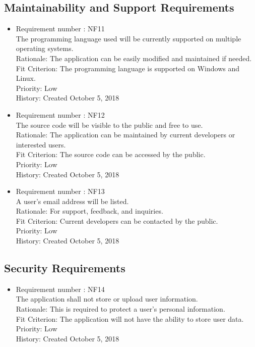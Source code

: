 \documentclass[12pt, titlepage]{article}
\begin{document}
\subsection{Maintainability and Support Requirements}
\begin{itemize}
\item Requirement number : NF11\\
The programming language used will be currently supported on multiple operating systems.\\
Rationale: The application can be easily modified and maintained if needed.\\
Fit Criterion: The programming language is supported on Windows and Linux.\\
Priority: Low\\
History: Created October 5, 2018
\item Requirement number : NF12\\
The source code will be visible to the public and free to use.\\
Rationale: The application can be maintained by current developers or interested users.\\
Fit Criterion: The source code can be accessed by the public.\\
Priority: Low\\
History: Created October 5, 2018
\item Requirement number : NF13\\
A user's email address will be listed.\\
Rationale: For support, feedback, and inquiries.\\ 
Fit Criterion: Current developers can be contacted by the public.\\
Priority: Low\\
History: Created October 5, 2018

\end{itemize}
\subsection{Security Requirements}
\begin{itemize}
\item Requirement number : NF14\\
The application shall not store or upload user information.\\
Rationale: This is required to protect a user's personal information.\\
Fit Criterion: The application will not have the ability to store user data.\\
Priority: Low\\
History: Created October 5, 2018
\end{itemize}
\end{document}
